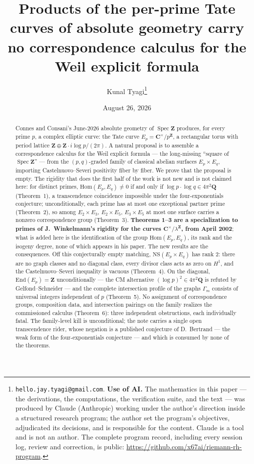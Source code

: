 \documentclass[11pt]{article}
\title{Products of the per-prime Tate curves of absolute geometry carry no
correspondence calculus for the Weil explicit formula}
\author{Kunal Tyagi\thanks{%
\texttt{hello.jay.tyagi@gmail.com}. \textbf{Use of AI.} The mathematics in this
paper --- the derivations, the computations, the verification suite, and the
text --- was produced by Claude (Anthropic) working under the author's direction
inside a structured research program; the author set the program's objectives,
adjudicated its decisions, and is responsible for the content. Claude is a tool and
is not an author. The complete program record, including every session log, review
and correction, is public: \url{https://github.com/x67ai/riemann-rh-program}.}}
\date{August 26, 2026}
\theoremstyle{definition}
\theoremstyle{remark}
\newcommand{\Z}{\mathbf{Z}}
\newcommand{\Q}{\mathbf{Q}}
\newcommand{\C}{\mathbf{C}}
\newcommand{\NS}{\mathrm{NS}}
\newcommand{\Hom}{\mathrm{Hom}}
\newcommand{\End}{\mathrm{End}}
\newcommand{\SpecZ}{\operatorname{Spec}\Z}
\begin{document}
\maketitle

\begin{abstract}
Connes and Consani's June-2026 absolute geometry of $\SpecZ$ produces, for
every prime $p$, a complex elliptic curve: the Tate curve
$E_p = \C^\times/p^{\Z}$, a rectangular torus with period lattice
$\Z \oplus \Z\cdot i\log p/(2\pi)$. A natural proposal is to assemble a
correspondence calculus for the Weil explicit formula --- the long-missing
``square of $\SpecZ$'' --- from the $(p,q)$-graded family of classical abelian
surfaces $E_p \times E_q$, importing Castelnuovo--Severi positivity fiber by
fiber. We prove that the proposal is empty. The rigidity that does the first
half of the work is not new and is not claimed here: for distinct primes,
$\Hom(E_p, E_q) \neq 0$ if and only if $\log p \cdot \log q \in 4\pi^2\Q$
(Theorem~1), a transcendence coincidence impossible under the
four-exponentials conjecture; unconditionally, each prime has at most one
exceptional partner prime (Theorem~2), so among $E_2\times E_3$,
$E_2\times E_5$, $E_3\times E_5$ at most one surface carries a nonzero
correspondence group (Theorem~3). \textbf{Theorems 1--3 are a specialization
to primes of J.~Winkelmann's rigidity for the curves $\C^\times/\lambda^{\Z}$,
from April 2002}; what is added here is the identification of the group
$\Hom(E_p, E_q)$, its rank and the isogeny degree, none of which appears in his
paper. The new results are the consequences. Off this conjecturally empty
matching,
$\NS(E_p \times E_q)$ has rank $2$: there are no graph classes and no diagonal
class, every divisor class acts as zero on $H^1$, and the
Castelnuovo--Severi inequality is vacuous (Theorem~4). On the diagonal,
$\End(E_p) = \Z$ unconditionally --- the CM alternative
$(\log p)^2 \in 4\pi^2\Q$ is refuted by Gelfond--Schneider --- and the
complete intersection profile of the graphs $\Gamma_m$ consists of universal
integers independent of $p$ (Theorem~5). No assignment of correspondence
groups, composition data, and intersection pairings on the family realizes the
commissioned calculus (Theorem~6): three independent obstructions, each
individually fatal. The family-level kill is unconditional; the note carries a
single open transcendence rider, whose negation is a published conjecture of
D.~Bertrand --- the weak form of the four-exponentials conjecture --- and which
is consumed by none of the theorems.
\end{abstract}
\end{document}
